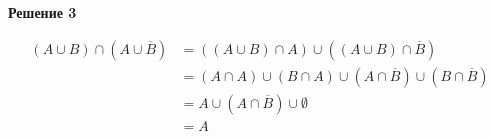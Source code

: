 \documentclass{article}
\begin{document}
\textbf{Решение 3}

\begin{equation} 
\begin{split}
(A \cup B) \cap (A \cup \overline{B}) 
& = ((A \cup B) \cap A) \cup ((A \cup B) \cap \overline{B}) \\
& = (A \cap A) \cup (B \cap A) \cup (A \cap \overline{B}) \cup (B \cap \overline{B}) \\
& = A \cup (A \cap \overline{B}) \cup \emptyset \\
& = A  \\
\end{split}
\end{equation}
\end{document}
